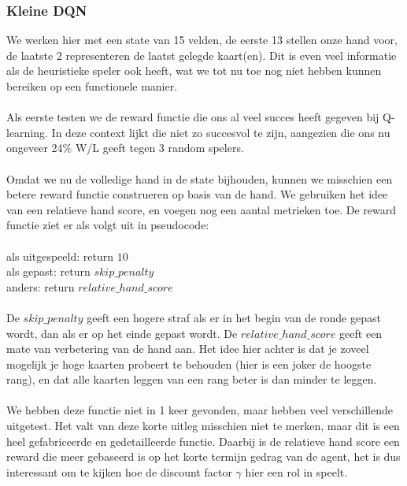\documentclass[11pt]{article}
\begin{document}
\subsubsection{Kleine DQN}
We werken hier met een state van 15 velden, de eerste 13 stellen onze hand voor, de laatste 2 representeren de laatst gelegde kaart(en). Dit is even veel informatie als de heuristieke speler ook heeft, wat we tot nu toe nog niet hebben kunnen bereiken op een functionele manier.\\\\
Als eerste testen we de reward functie die ons al veel succes heeft gegeven bij Q-learning. In deze context lijkt die niet zo succesvol te zijn, aangezien die ons nu ongeveer 24\% W/L geeft tegen 3 random spelers. \\\\
Omdat we nu de volledige hand in de state bijhouden, kunnen we misschien een betere reward functie construeren op basis van de hand. We gebruiken het idee van een relatieve hand score, en voegen nog een aantal metrieken toe. De reward functie ziet er als volgt uit in pseudocode:\\\\
\indent als uitgespeeld: return $10$\\
\indent als gepast: return $skip\_penalty$\\
\indent anders: return $relative\_hand\_score$\\\\
De $skip\_penalty$ geeft een hogere straf als er in het begin van de ronde gepast wordt, dan als er op het einde gepast wordt. De $relative\_hand\_score$ geeft een mate van verbetering van de hand aan. Het idee hier achter is dat je zoveel mogelijk je hoge kaarten probeert te behouden (hier is een joker de hoogste rang), en dat alle kaarten leggen van een rang beter is dan minder te leggen. \\\\
We hebben deze functie niet in 1 keer gevonden, maar hebben veel verschillende uitgetest. Het valt van deze korte uitleg misschien niet te merken, maar dit is een heel gefabriceerde en gedetailleerde functie. Daarbij is de relatieve hand score een reward die meer gebaseerd is op het korte termijn gedrag van de agent, het is dus interessant om te kijken hoe de discount factor $\gamma$ hier een rol in speelt.\\
\end{document}
